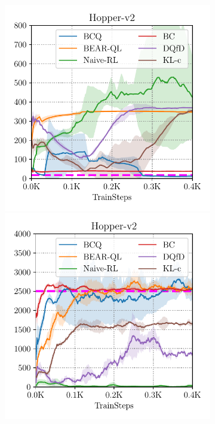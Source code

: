 \begin{figure}
\begin{subfigure}[t]{0.23\textwidth}
    \end{subfigure}
    ~
    \begin{subfigure}[t]{0.23\textwidth}
        \centering
        \includegraphics[width=0.99\linewidth]{chapters/bear/images/images_camera_ready/hopper_random_camera_ready.pdf}
        \includegraphics[width=0.99\linewidth]{chapters/bear/images/images_camera_ready/hopper_optimal_camera_ready.pdf}

\end{subfigure}
\end{figure}
